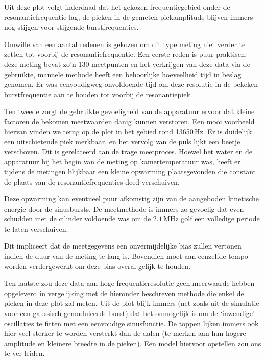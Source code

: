 Uit deze plot volgt inderdaad dat het gekozen frequentiegebied onder de 
resonantiefrequentie lag, de pieken in de gemeten piekamplitude blijven 
immers nog stijgen voor stijgende burstfrequenties.

Omwille van een aantal redenen is gekozen om dit type meting niet verder te 
zetten tot voorbij de resonantiefrequentie. Een eerste reden is puur 
praktisch: deze meting bevat zo'n 130 meetpunten en het verkrijgen van deze 
data via de gebruikte, manuele methode heeft een behoorlijke hoeveelheid 
tijd in beslag genomen. Er was eenvoudigweg onvoldoende tijd om deze 
resolutie in de bekeken burstfrequentie aan te houden tot voorbij de 
resonantiepiek.


Ten tweede zorgt de gebruikte gevoeligheid van de apparatuur ervoor dat 
kleine factoren de bekomen meetwaarden danig kunnen verstoren. Een mooi 
voorbeeld hiervan vinden we terug op de plot in het gebied rond 13650\,Hz.  
Er is duidelijk een uitschietende piek merkbaar, en het vervolg van de puls 
lijkt een beetje verschoven. Dit is gerelateerd aan de trage meetproces.  
Hoewel het water en de apparatuur bij het begin van de meting op 
kamertemperatuur was, heeft er tijdens de metingen blijkbaar een kleine 
opwarming plaatsgevonden die constant de plaats van de 
resonantiefrequenties deed verschuiven.

Deze opwarming kan eventueel puur afkomstig zijn van de aangeboden 
kinetische energie door de sinusbursts. De meetmethode is immers zo 
gevoelig dat even schudden met de cilinder voldoende was om de $2.1$\,MHz 
golf een volledige periode te laten verschuiven.

Dit impliceert dat de meetgegevens een onvermijdelijke bias zullen vertonen 
indien de duur van de meting te lang is. Bovendien moet aan eenzelfde tempo 
worden verdergewerkt om deze bias overal gelijk te houden.


Ten laatste zou deze data aan hoge frequentieresolutie geen meerwaarde 
hebben opgeleverd in vergelijking met de hieronder beschreven methode die 
enkel de pieken in deze plot zal meten.  Uit de plot blijk immers (net 
zoals uit de simulatie voor een gaussisch gemoduleerde burst) dat het 
onmogelijk is om de `inwendige' oscillaties te fitten met een eenvoudige 
sinusfunctie.  De toppen lijken immers ook hier veel sterker te worden 
versterkt dan de dalen (te merken aan hun hogere amplitude en kleinere 
breedte in de pieken). Een model hiervoor opstellen zou ons te ver leiden.



